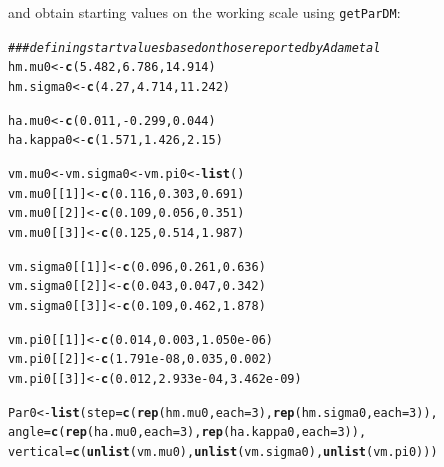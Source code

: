 \documentclass[12pt]{article}\usepackage[]{graphicx}\usepackage[]{xcolor}
\makeatletter
\newcommand{\hlnum}[1]{\textcolor[rgb]{0.686,0.059,0.569}{#1}}%
\newcommand{\hlcom}[1]{\textcolor[rgb]{0.678,0.584,0.686}{\textit{#1}}}%
\newcommand{\hlopt}[1]{\textcolor[rgb]{0,0,0}{#1}}%
\newcommand{\hldef}[1]{\textcolor[rgb]{0.345,0.345,0.345}{#1}}%
\newcommand{\hlkwb}[1]{\textcolor[rgb]{0.69,0.353,0.396}{#1}}%
\newcommand{\hlkwc}[1]{\textcolor[rgb]{0.333,0.667,0.333}{#1}}%
\newcommand{\hlkwd}[1]{\textcolor[rgb]{0.737,0.353,0.396}{\textbf{#1}}}%
\newenvironment{kframe}{%
 \def\at@end@of@kframe{}%
 \ifinner\ifhmode%
  \def\at@end@of@kframe{\end{minipage}}%
  \begin{minipage}{\columnwidth}%
 \fi\fi%
 \def\FrameCommand##1{\hskip\@totalleftmargin \hskip-\fboxsep
 \colorbox{shadecolor}{##1}\hskip-\fboxsep
     \hskip-\linewidth \hskip-\@totalleftmargin \hskip\columnwidth}%
 \MakeFramed {\advance\hsize-\width
   \@totalleftmargin\z@ \linewidth\hsize
   \@setminipage}}%
 {\par\unskip\endMakeFramed%
 \at@end@of@kframe}
\newenvironment{knitrout}{}{} %
\makeatother
\begin{document}
\noindent and obtain starting values on the working scale using \verb|getParDM|:
\begin{knitrout}
\color{fgcolor}\begin{kframe}
\begin{alltt}
\hlcom{### defining start values based on those reported by Adam et al}
\hldef{hm.mu0} \hlkwb{<-} \hlkwd{c}\hldef{(}\hlnum{5.482}\hldef{,} \hlnum{6.786}\hldef{,} \hlnum{14.914}\hldef{)}
\hldef{hm.sigma0} \hlkwb{<-} \hlkwd{c}\hldef{(}\hlnum{4.27}\hldef{,} \hlnum{4.714}\hldef{,} \hlnum{11.242}\hldef{)}

\hldef{ha.mu0} \hlkwb{<-} \hlkwd{c}\hldef{(}\hlnum{0.011}\hldef{,} \hlopt{-}\hlnum{0.299}\hldef{,} \hlnum{0.044}\hldef{)}
\hldef{ha.kappa0} \hlkwb{<-} \hlkwd{c}\hldef{(}\hlnum{1.571}\hldef{,} \hlnum{1.426}\hldef{,} \hlnum{2.15}\hldef{)}

\hldef{vm.mu0} \hlkwb{<-} \hldef{vm.sigma0} \hlkwb{<-} \hldef{vm.pi0} \hlkwb{<-} \hlkwd{list}\hldef{()}
\hldef{vm.mu0[[}\hlnum{1}\hldef{]]} \hlkwb{<-} \hlkwd{c}\hldef{(}\hlnum{0.116}\hldef{,} \hlnum{0.303}\hldef{,} \hlnum{0.691}\hldef{)}
\hldef{vm.mu0[[}\hlnum{2}\hldef{]]} \hlkwb{<-} \hlkwd{c}\hldef{(}\hlnum{0.109}\hldef{,} \hlnum{0.056}\hldef{,} \hlnum{0.351}\hldef{)}
\hldef{vm.mu0[[}\hlnum{3}\hldef{]]} \hlkwb{<-} \hlkwd{c}\hldef{(}\hlnum{0.125}\hldef{,} \hlnum{0.514}\hldef{,} \hlnum{1.987}\hldef{)}

\hldef{vm.sigma0[[}\hlnum{1}\hldef{]]} \hlkwb{<-} \hlkwd{c}\hldef{(}\hlnum{0.096}\hldef{,} \hlnum{0.261}\hldef{,} \hlnum{0.636}\hldef{)}
\hldef{vm.sigma0[[}\hlnum{2}\hldef{]]} \hlkwb{<-} \hlkwd{c}\hldef{(}\hlnum{0.043}\hldef{,} \hlnum{0.047}\hldef{,} \hlnum{0.342}\hldef{)}
\hldef{vm.sigma0[[}\hlnum{3}\hldef{]]} \hlkwb{<-} \hlkwd{c}\hldef{(}\hlnum{0.109}\hldef{,} \hlnum{0.462}\hldef{,} \hlnum{1.878}\hldef{)}

\hldef{vm.pi0[[}\hlnum{1}\hldef{]]} \hlkwb{<-} \hlkwd{c}\hldef{(}\hlnum{0.014}\hldef{,} \hlnum{0.003}\hldef{,} \hlnum{1.050e-06}\hldef{)}
\hldef{vm.pi0[[}\hlnum{2}\hldef{]]} \hlkwb{<-} \hlkwd{c}\hldef{(}\hlnum{1.791e-08}\hldef{,} \hlnum{0.035}\hldef{,} \hlnum{0.002}\hldef{)}
\hldef{vm.pi0[[}\hlnum{3}\hldef{]]} \hlkwb{<-} \hlkwd{c}\hldef{(}\hlnum{0.012}\hldef{,} \hlnum{2.933e-04}\hldef{,} \hlnum{3.462e-09}\hldef{)}

\hldef{Par0} \hlkwb{<-} \hlkwd{list}\hldef{(}\hlkwc{step}\hldef{=}\hlkwd{c}\hldef{(}\hlkwd{rep}\hldef{(hm.mu0,}\hlkwc{each}\hldef{=}\hlnum{3}\hldef{),}\hlkwd{rep}\hldef{(hm.sigma0,}\hlkwc{each}\hldef{=}\hlnum{3}\hldef{)),}
             \hlkwc{angle}\hldef{=}\hlkwd{c}\hldef{(}\hlkwd{rep}\hldef{(ha.mu0,}\hlkwc{each}\hldef{=}\hlnum{3}\hldef{),}\hlkwd{rep}\hldef{(ha.kappa0,}\hlkwc{each}\hldef{=}\hlnum{3}\hldef{)),}
             \hlkwc{vertical}\hldef{=}\hlkwd{c}\hldef{(}\hlkwd{unlist}\hldef{(vm.mu0),}\hlkwd{unlist}\hldef{(vm.sigma0),}\hlkwd{unlist}\hldef{(vm.pi0)))}


\end{alltt}
\end{kframe}
\end{knitrout}
\end{document}
